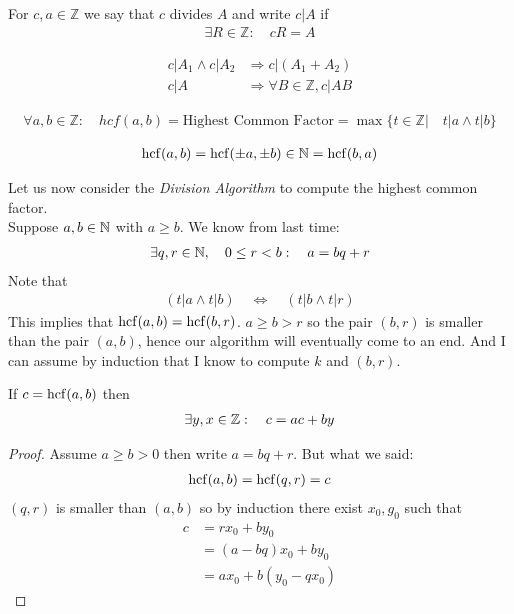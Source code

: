\begin{df}
For $c,a \in \mathbb Z$ we say that $c$ divides $A$ and write $c|A$ if 
\begin{align*}
\exists R \in \mathbb Z: \quad cR=A
\end{align*}
\end{df}
\begin{rk}
\begin{align*}
c|A_1 \wedge c|A_2 &\Rightarrow c|(A_1+A_2) \\
c|A & \Rightarrow \forall B \in \mathbb Z, c|AB
\end{align*}
\end{rk}
\begin{df}
\begin{align*}
\forall a,b \in \mathbb Z: \quad  hcf(a,b) = \text{Highest Common Factor} = \max\{t \in \mathbb Z| \quad t|a \wedge t|b \}
\end{align*}
\end{df}
\begin{rk}
\begin{align*}
\operatorname{hcf}(a,b) = \operatorname{hcf}(\pm a, \pm b) \in \mathbb N = \operatorname{hcf}(b,a)
\end{align*}
\end{rk}
Let us now consider the \emph{Division Algorithm} to compute the highest common factor. \\
Suppose $a,b \in \mathbb N$ with $a \ge b$. We know from last time:
\begin{align*}
\exists q,r \in \mathbb N, \quad 0 \le r < b: \quad a= bq+r
\end{align*}
Note that
\begin{align*}
(t|a \wedge t|b) \quad \Leftrightarrow \quad (t|b \wedge t|r)
\end{align*} This implies that $\operatorname{hcf}(a,b) = \operatorname{hcf}(b,r)$.
$a \ge b> r$ so the pair $(b,r)$ is smaller than the pair $(a,b)$, hence our algorithm will eventually come to an end. And I can assume by induction that I know to compute $k$ and $(b,r)$.


\begin{tm}
If $c = \operatorname{hcf}(a,b)$ then 
\begin{align*}
\exists y,x \in \mathbb Z: \quad c= ac+by
\end{align*}
\end{tm}
\begin{proof}
Assume $a \ge b > 0$ then write $a=bq+r$.
But what we said:
\begin{align*}
\operatorname{hcf}(a,b) =  \operatorname{hcf}(q,r) = c
\end{align*}
$(q,r)$ is smaller than $(a,b)$ so by induction there exist $x_0, g_0$ such that
\begin{align*}
c & = rx_0 + by_0 \\
& = (a-bq)x_0 + by_0 \\
& = ax_0 + b(y_0-qx_0)
\end{align*}
\end{proof}

